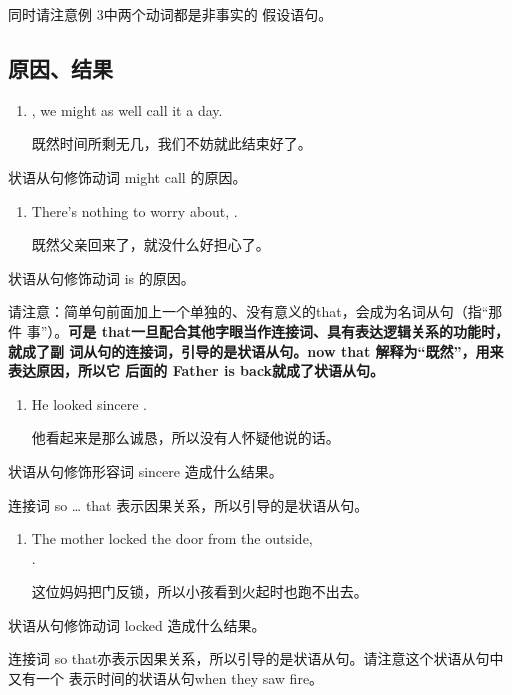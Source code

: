 同时请注意例 3中两个动词都是非事实的
假设语句。

\subsection{原因、结果}

\begin{enumerate}
\item {} , we might as
  well call it a day.

  既然时间所剩无几，我们不妨就此结束好了。
\end{enumerate}
状语从句修饰动词 might call 的原因。

\begin{enumerate}[resume]
\item There's nothing to worry about,  .

  既然父亲回来了，就没什么好担心了。
\end{enumerate}
状语从句修饰动词 is 的原因。

请注意：简单句前面加上一个单独的、没有意义的that，会成为名词从句（指“那件
事”）。\textbf{可是 that一旦配合其他字眼当作连接词、具有表达逻辑关系的功能时，就成了副
  词从句的连接词，引导的是状语从句。now that 解释为“既然”，用来表达原因，所以它
  后面的 Father is back就成了状语从句。}

\begin{enumerate}[resume]
\item He looked  sincere  .

他看起来是那么诚恳，所以没有人怀疑他说的话。
\end{enumerate}
状语从句修饰形容词 sincere 造成什么结果。

连接词 so \ldots{} that 表示因果关系，所以引导的是状语从句。

\begin{enumerate}[resume]
\item The mother locked the door from the outside,  \\
  .

  这位妈妈把门反锁，所以小孩看到火起时也跑不出去。
\end{enumerate}

状语从句修饰动词 locked 造成什么结果。

连接词 so that亦表示因果关系，所以引导的是状语从句。请注意这个状语从句中又有一个
表示时间的状语从句when they saw fire。

